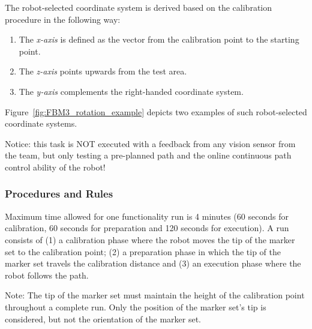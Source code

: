 The robot-selected coordinate system is derived based on the calibration procedure in the following way:
\begin{enumerate}
	\item The \emph{x-axis} is defined as the vector from the calibration point to the starting point.
	\item The \emph{z-axis} points upwards from the test area.
	\item The \emph{y-axis} complements the right-handed coordinate system.
\end{enumerate}
Figure~\ref{fig:FBM3_rotation_example} depicts two examples of such robot-selected coordinate systems.

Notice: this task is NOT executed with a feedback from any vision sensor from the team, but only testing a pre-planned path and the online continuous path control ability of the robot!

\subsubsection{Procedures and Rules}
\label{sssec:ControlProcedures}

Maximum time allowed for one functionality run is 4 minutes (60 seconds for calibration, 60 seconds for preparation and 120 seconds for execution). A run consists of (1) a calibration phase where the robot moves the tip of the marker set to the calibration point; (2) a preparation phase in which the tip of the marker set travels the calibration distance and (3) an execution phase where the robot follows the path.

Note: The tip of the marker set must maintain the height of the calibration point throughout a complete run. Only the position of the marker set's tip is considered, but not the orientation of the marker set.

